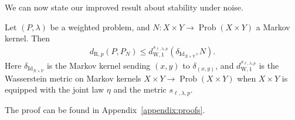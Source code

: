 \documentclass[twoside,11pt]{article}
\DeclareMathOperator{\prob}{Prob}
\DeclareMathOperator{\id}{Id}
\newcommand{\dexp}[1][]{d_{\mathrm{R}#1}}
\newcommand{\dWkernp}[1]{d_{\mathrm{W},#1}}
\newcommand{\dWkern}{\dWkernp{1}}
\begin{document}
We can now state our improved result about stability under noise.
\begin{theorem}\label{thm:non-metric-bound}
    Let $(P,\lambda)$ be a weighted problem, and $N:X\times Y \to \prob(X\times Y)$ a Markov kernel. Then
    \begin{align*}
    \dexp[,p](P,P_N)
    \leq
    \dWkern^{s_{\ell,\lambda,p}}(\delta_{\id_{X\times Y}}, N).
    \end{align*}
    Here $\delta_{\id_{X\times Y}}$ is the Markov kernel sending $(x,y)$ to $\delta_{(x,y)}$, and $\dWkern^{s_{\ell,\lambda,p}}$ is the Wasserstein metric on Markov kernels $X\times Y \to \prob(X\times Y)$ when $X\times Y$ is equipped with the joint law $\eta$ and the metric $s_{\ell,\lambda,p}$.
\end{theorem}
The proof can be found in Appendix~\ref{appendix:proofs}.
\end{document}
